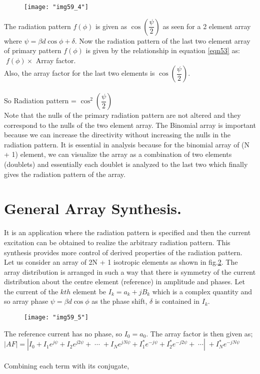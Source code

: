 	\begin{figure}[H]
		\centering
		\texttt{[image: "img59\_4"]}
		\caption{}
		\label{fig:fig-3}
	\end{figure}
	The radiation pattern $f(\phi)$ is given as $\cos(\dfrac{\psi}{2})$ as seen for a 2 element array where $\psi = \beta d\cos\phi + \delta$. Now the radiation pattern of the last two element array of primary pattern $f(\phi)$ is given by the relationship in equation \ref{eqn53} as:   $\; f(\phi) \times$ Array factor.
	\\
	Also, the array factor for the last two elements is $\cos(\dfrac{\psi}{2})$.\\
	\\
	So Radiation pattern = $\cos^2(\dfrac{\psi}{2})$\\
	Note that the nulls of the primary radiation pattern are not altered and they correspond to the nulls of the two element array. The Binomial array is important because we can increase the directivity without increasing the nulls in the radiation pattern. It is essential in analysis because for the binomial array of (N + 1) element, we can visualize the array as a combination of two elements (doublets) and essentially each doublet is analyzed to the last two which finally gives the radiation pattern of the array.
	
	\section{General Array Synthesis.}
	It is an application where the radiation pattern is specified and then the current excitation can be obtained to realize the arbitrary radiation pattern. This synthesis provides more control of derived properties of the radiation pattern.\\
	Let us consider an array of 2N + 1 isotropic elements as shown in fig.\ref{fig:fig-4}. The array distribution is arranged in such a way that there is symmetry of the current distribution about the centre element (reference) in amplitude and phases. Let the current of the $kth$ element be $I_k =a_k + jB_k$ which is a complex quantity and so array phase $\psi =\beta d\cos\phi$ as the phase shift, $\delta$ is contained in $I_k$.\\
	\begin{figure}[H]
		\centering
		\texttt{[image: "img59\_5"]}
		\caption{}
		\label{fig:fig-4}
	\end{figure}
	The reference current has no phase, so $I_0 = a_0$. The array factor is then given as;\\
	$|AF| = |I_0 + I_1 e^{j\psi} + I_2 e^{j2\psi} + \; \cdots \; + I_N e^{jN\psi} + I_1^\ast e^{-j\psi} + I_2^\ast e^{-j2\psi} + \; \cdots|\; + I_N^\ast e^{-jN\psi}$\\
	\\
	Combining each term with its conjugate,\\
	
